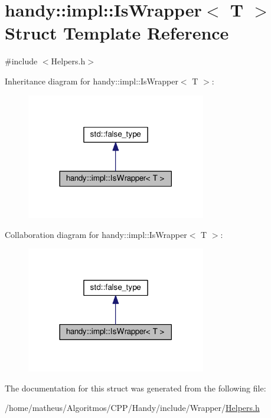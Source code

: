 \hypertarget{structhandy_1_1impl_1_1IsWrapper}{}\section{handy\+:\+:impl\+:\+:Is\+Wrapper$<$ T $>$ Struct Template Reference}
\label{structhandy_1_1impl_1_1IsWrapper}


{\ttfamily \#include $<$Helpers.\+h$>$}



Inheritance diagram for handy\+:\+:impl\+:\+:Is\+Wrapper$<$ T $>$\+:\nopagebreak
\begin{figure}[H]
\begin{center}
\leavevmode
\includegraphics[width=222pt]{structhandy_1_1impl_1_1IsWrapper__inherit__graph}
\end{center}
\end{figure}


Collaboration diagram for handy\+:\+:impl\+:\+:Is\+Wrapper$<$ T $>$\+:\nopagebreak
\begin{figure}[H]
\begin{center}
\leavevmode
\includegraphics[width=222pt]{structhandy_1_1impl_1_1IsWrapper__coll__graph}
\end{center}
\end{figure}


The documentation for this struct was generated from the following file\+:\begin{DoxyCompactItemize}
\item 
/home/matheus/\+Algoritmos/\+C\+P\+P/\+Handy/include/\+Wrapper/\hyperlink{Wrapper_2Helpers_8h}{Helpers.\+h}\end{DoxyCompactItemize}
